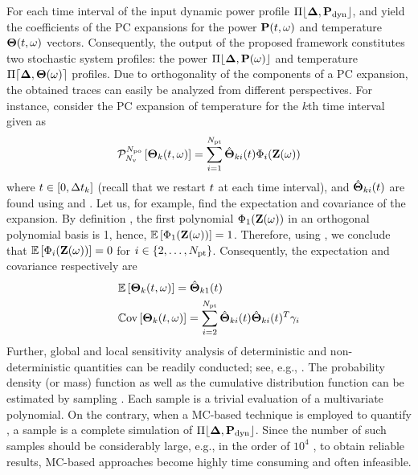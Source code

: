 For each time interval of the input dynamic power profile $\profPdyn$,  and  yield the coefficients of the PC expansions for the power $\mathbf{P}(t, \omega)$ and temperature ${\boldsymbol\Theta}(t, \omega)$ vectors. Consequently, the output of the proposed framework constitutes two stochastic system profiles: the power $\profP{\o}$ and temperature $\profT{\o}$ profiles. Due to orthogonality of the components of a PC expansion, the obtained traces can easily be analyzed from different perspectives. For instance, consider the PC expansion of temperature for the $k$th time interval given as
\begin{equation} \elabel{pc-k}
  \oPC{\vars}{\pcorder}{\vTO_k(\t, \o)} = \sum_{i = 1}^{\pcterms} \pcc{\vTO}_{ki}(\t) \pcb_i(\vZ(\o))
\end{equation}
where $t \in [0, \Delta t_k]$ (recall that we restart $t$ at each time interval), and $\hat{{\boldsymbol\Theta}}_{ki}(t)$ are found using  and . Let us, for example, find the expectation and covariance of the expansion. By definition \cite{xiu2010}, the first polynomial $\Phi_1(\mathbf{Z}(\omega))$ in an orthogonal polynomial basis is 1, hence, $\mathbb{E}\left[\Phi_1(\mathbf{Z}(\omega))\right] = 1$. Therefore, using , we conclude that $\mathbb{E}\left[\Phi_i(\mathbf{Z}(\omega))\right] = 0$ for $i \in \{ 2, \dotsc, {N_\text{pt}} \}$. Consequently, the expectation and covariance respectively are
\begin{align*}
  & \mathbb{E}\left[{\boldsymbol\Theta}_k(t, \omega)\right] = \hat{{\boldsymbol\Theta}}_{k1}(t) \\
  & \mathbb{C}\text{ov}\left[{\boldsymbol\Theta}_k(t, \omega)\right] = \sum_{i = 2}^{{N_\text{pt}}} \hat{{\boldsymbol\Theta}}_{ki}(t) \hat{{\boldsymbol\Theta}}_{ki}(t)^T \gamma_i
\end{align*}
Further, global and local sensitivity analysis of deterministic and non-deterministic quantities can be readily conducted; see, e.g., \cite{eldred2009, maitre2010}. The probability density (or mass) function as well as the cumulative distribution function can be estimated by sampling . Each sample is a trivial evaluation of a multivariate polynomial. On the contrary, when a MC-based technique is employed to quantify , a sample is a complete simulation of $\profPdyn$. Since the number of such samples should be considerably large, e.g., in the order of $10^4$ \cite{xiu2010}, to obtain reliable results, MC-based approaches become highly time consuming and often infeasible.
